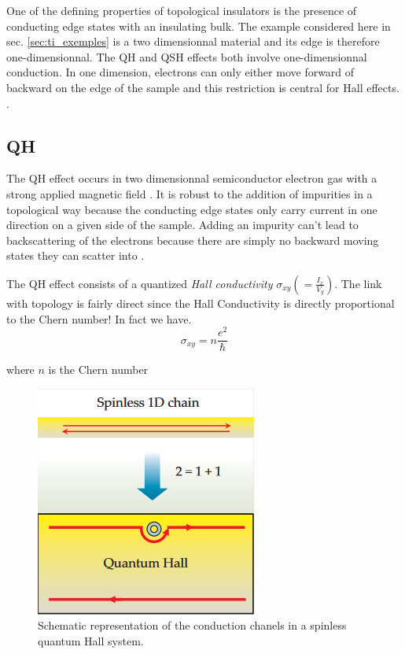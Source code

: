 One of the defining properties of topological insulators is the presence of conducting edge states with an insulating bulk. The example considered here in sec. \ref{sec:ti_exemples} is a two dimensionnal material and its edge is therefore one-dimensionnal. The QH and QSH effects both involve one-dimensionnal conduction. In one dimension, electrons can only either move forward of backward on the edge of the sample and this restriction is central for Hall effects. \cite{qi_quantum_2010}. 
\subsection{QH}
The QH effect occurs in two dimensionnal semiconductor electron gas with a strong applied magnetic field \cite{qi_quantum_2010}. It is robust to the addition of impurities in a topological way because the conducting edge states only carry current in one direction on a given side of the sample. Adding an impurity can't lead to backscattering of the electrons because there are simply no backward moving states they can scatter into \cite{qi_quantum_2010}. 

The QH effect consists of a quantized \textit{Hall conductivity} $\sigma_{xy}(=\frac{I_x}{V_y})$. The link with topology is fairly direct since the Hall Conductivity is directly proportional to the Chern number! In fact we have.
\begin{equation}
\sigma_{xy} = n\frac{e^2}{\hbar}
\end{equation}

where $n$ is the Chern number

\begin{figure}[h!]
    \includegraphics[scale = 0.7]{sections/visuel/spinless.png}
    \caption{Schematic representation of the conduction chanels in a spinless quantum Hall system.\cite{qi_quantum_2010}}
    \label{spinless}
\end{figure}



